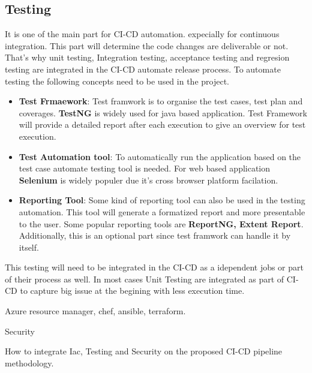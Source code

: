 \subsection{Testing}
It is one of the main part for CI-CD automation. expecially for continuous integration. This part will determine the code changes are deliverable or not. That's why unit testing, Integration testing, acceptance testing and regresion testing are integrated in the CI-CD automate release process. To automate testing the following concepts need to be used in the project.
\begin{itemize}
	\item \textbf{Test Frmaework}: Test framwork is to organise the test cases, test plan and coverages. \textbf{TestNG} is widely used for java based application. Test Framework will provide a detailed report after each execution to give an overview for test execution.
	\item \textbf{Test Automation tool}: To automatically run the application based on the test case automate testing tool is needed. For web based application \textbf{Selenium} is widely populer due it's cross browser platform facilation.
	\item \textbf{Reporting Tool}: Some kind of reporting tool can also be used in the testing automation. This tool will generate a formatized report and more presentable to the user. Some popular reporting tools are \textbf{ReportNG, Extent Report}. Additionally, this is an optional part since test framwork can handle it by itself.
\end{itemize}
This testing will need to be integrated in the CI-CD as a idependent jobs or part of their process as well. In most cases Unit Testing are integrated as part of CI-CD to capture big issue at the begining with less execution time.

Azure resource manager, chef, ansible, terraform.

Security

How to integrate Iac, Testing and Security on the proposed CI-CD pipeline methodology.